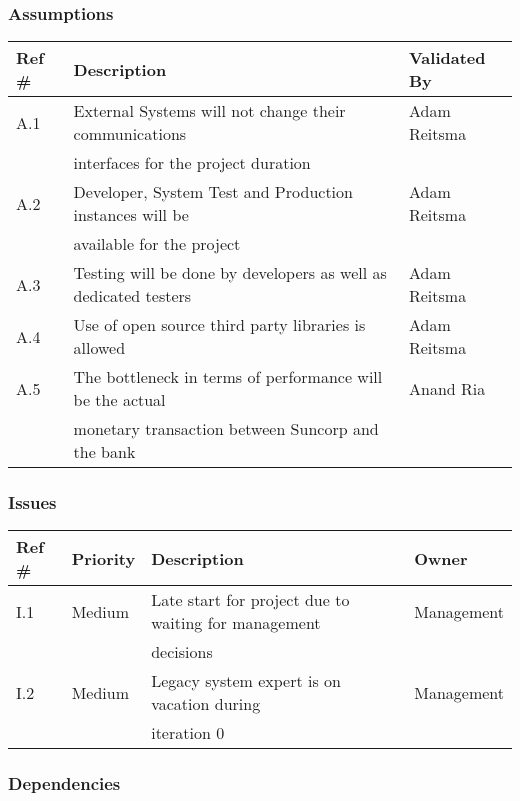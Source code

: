 \subsubsection{Assumptions}

\begin{tabular}{|l|l|l|}
\hline
{\bf Ref \#} & {\bf Description} & {\bf Validated By} \\
\hline
A.1 & External Systems will not change their communications  \ \  & Adam Reitsma \\  & interfaces for the project duration &  \\
\hline
A.2 & Developer, System Test and Production instances will be & Adam Reitsma \\ & available for the project & \\
\hline
A.3 & Testing will be done by developers as well as dedicated testers & Adam Reitsma \\ 
\hline
A.4 & Use of open source third party libraries is allowed & Adam Reitsma \\
\hline
A.5 & The bottleneck in terms of performance will be the actual   & Anand Ria \\ & monetary transaction between Suncorp and the bank & \\
\hline
\end{tabular}

\subsubsection{Issues}

\begin{tabular}{|l|l|l|l|}
\hline
{\bf Ref \#} & {\bf Priority} & {\bf Description} & {\bf Owner} \\
\hline
I.1 & Medium & Late start for project due to waiting for management  & Management \\ & & decisions & \\
\hline
I.2 & Medium & Legacy system expert is on vacation during  & Management \\ && iteration 0 & \\
\hline
\end{tabular}

\subsubsection{Dependencies}

